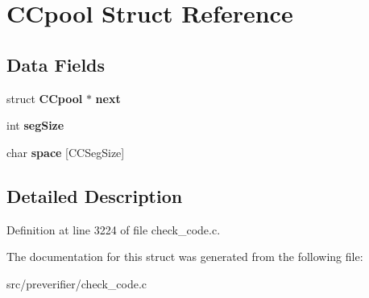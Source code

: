 \section{CCpool Struct Reference}
\label{struct_c_cpool}
\subsection*{Data Fields}
\begin{DoxyCompactItemize}
\item 
struct {\bf CCpool} $\ast$ {\bfseries next}\label{struct_c_cpool_a9100e775f870b4d8c47ae16887ba0385}

\item 
int {\bfseries segSize}\label{struct_c_cpool_a615447d95eab0b399fc04119f9328a3b}

\item 
char {\bfseries space} [CCSegSize]\label{struct_c_cpool_a023a09c29a7e98fa3caf3d2005fa98b1}

\end{DoxyCompactItemize}


\subsection{Detailed Description}


Definition at line 3224 of file check\_\-code.c.



The documentation for this struct was generated from the following file:\begin{DoxyCompactItemize}
\item 
src/preverifier/check\_\-code.c\end{DoxyCompactItemize}
